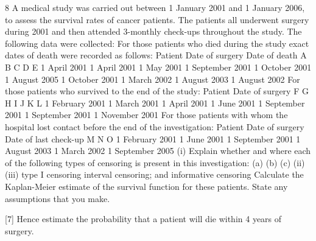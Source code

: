 \documentclass[a4paper,12pt]{article}
\begin{document}
\begin{enumerate}

8
A medical study was carried out between 1 January 2001 and 1 January 2006, to
assess the survival rates of cancer patients. The patients all underwent surgery during
2001 and then attended 3-monthly check-ups throughout the study.
The following data were collected:
For those patients who died during the study exact dates of death were recorded as
follows:
Patient Date of surgery Date of death
A
B
C
D
E 1 April 2001
1 April 2001
1 May 2001
1 September 2001
1 October 2001 1 August 2005
1 October 2001
1 March 2002
1 August 2003
1 August 2002
For those patients who survived to the end of the study:
Patient Date of surgery
F
G
H
I
J
K
L 1 February 2001
1 March 2001
1 April 2001
1 June 2001
1 September 2001
1 September 2001
1 November 2001
For those patients with whom the hospital lost contact before the end of the
investigation:
Patient Date of surgery Date of last check-up
M
N
O 1 February 2001
1 June 2001
1 September 2001 1 August 2003
1 March 2002
1 September 2005
(i)
Explain whether and where each of the following types of censoring is present
in this investigation:
(a)
(b)
(c)
(ii)
(iii)
type I censoring
interval censoring; and
informative censoring
Calculate the Kaplan-Meier estimate of the survival function for these
patients. State any assumptions that you make.

[7]
Hence estimate the probability that a patient will die within 4 years of surgery.



\end{enumerate}
\end{document}
